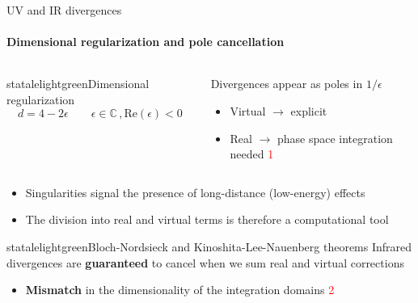 \begin{frame} {UV and IR divergences}
  \framesubtitle{Dimensional regularization and pole cancellation}

  \begin{columns}

    \begin{column}{0.4\textwidth}
    \begin{colorblock}[black]{statalelightgreen}{Dimensional regularization}
        \begin{equation*}
            d=4-2\epsilon \qquad \epsilon \in \mathbb{C} \, , \mathrm{Re}(\epsilon)<0
        \end{equation*}
      \end{colorblock}
    \end{column}

    \begin{column}{0.6\textwidth}
    Divergences appear as poles in $1/\epsilon$ \\
    \begin{itemize}
        \item Virtual $\to$ explicit
        \item Real $\to$ phase space integration needed \textcolor{red}{\textcircled{1}}
    \end{itemize}
    \end{column}
    \end{columns}

    \vspace{1.5em}

    \begin{itemize}
        \item Singularities signal the presence of long-distance (low-energy) effects
        \item The division into real and virtual terms is therefore a computational tool
    \end{itemize}

    \vspace{1.em}
\pause
    \begin{colorblock}[black]{statalelightgreen}{Bloch-Nordsieck and Kinoshita-Lee-Nauenberg theorems}
            Infrared divergences are \textbf{guaranteed} to cancel when we sum real and virtual corrections
      \end{colorblock}

      \begin{itemize}
        \item \textbf{Mismatch} in the dimensionality of the integration domains \textcolor{red}{\textcircled{2}}
    \end{itemize}
\end{frame}

